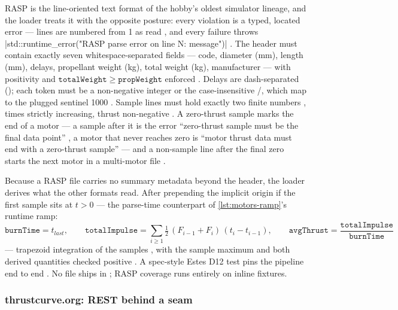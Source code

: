 RASP  is the line-oriented text format of the hobby's oldest simulator
lineage, and the loader treats it with the opposite posture: every violation is a typed,
located error --- lines are numbered from 1 as read , and
every failure throws
\cppinline|std::runtime_error("RASP parse error on line N: message")|
. The header must contain exactly seven
whitespace-separated fields --- code, diameter (mm), length (mm), delays, propellant
weight (kg), total weight (kg), manufacturer  --- with
positivity and $\mathtt{totalWeight}\ge\mathtt{propWeight}$ enforced
. Delays are dash-separated (); each token must
be a non-negative integer or the case-insensitive /, which map to the
plugged sentinel 1000 . Sample lines must hold exactly two
finite numbers , times strictly increasing, thrust
non-negative . A zero-thrust sample marks the end of a
motor --- a sample after it is the error ``zero-thrust sample must be the final data
point'' , a motor that never reaches zero is ``motor
thrust data must end with a zero-thrust sample''  --- and
a non-sample line after the final zero starts the next motor in a multi-motor file
.

Because a RASP file carries no summary metadata beyond the header, the loader derives
what the other formats read. After prepending the implicit origin if the first sample
sits at $t>0$  --- the parse-time counterpart of
\cref{lst:motors-ramp}'s runtime ramp:
\begin{equation}
\mathtt{burnTime} = t_{last},\qquad
\mathtt{totalImpulse} = \sum_{i\ge 1}\tfrac{1}{2}\,(F_{i-1}+F_i)\,(t_i - t_{i-1}),\qquad
\mathtt{avgThrust} = \frac{\mathtt{totalImpulse}}{\mathtt{burnTime}}
\end{equation}
--- trapezoid integration of the samples , with
 the sample maximum  and both derived
quantities checked positive . A spec-style Estes D12 test
pins the pipeline end to end . No 
file ships in ; RASP coverage runs entirely on inline fixtures.

\subsubsection{thrustcurve.org: REST behind a seam}\label{sec:motors-ingest-online}

